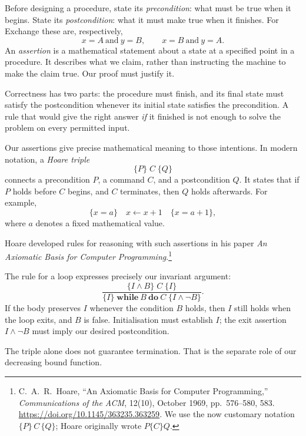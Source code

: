 
Before designing a procedure, state its \emph{precondition}: what must be
true when it begins. State its \emph{postcondition}: what it must make
true when it finishes. For Exchange these are, respectively,
\[
x=A\ \text{and}\ y=B,\qquad x=B\ \text{and}\ y=A.
\]
An \emph{assertion} is a mathematical statement about a state at a specified
point in a procedure. It describes what we claim, rather than instructing
the machine to make the claim true. Our proof must justify it.

Correctness has two parts: the procedure must finish, and its final state
must satisfy the postcondition whenever its initial state satisfies the
precondition. A rule that would give the right answer \emph{if} it finished
is not enough to solve the problem on every permitted input.



Our assertions give precise mathematical meaning to those intentions.
In modern notation, a \emph{Hoare triple}
\[
\{P\}\;C\;\{Q\}
\]
connects a precondition $P$, a command $C$, and a postcondition $Q$.
It states that if $P$ holds before $C$ begins, and $C$ terminates,
then $Q$ holds afterwards. For example,
\[
\{x=a\}\quad x\leftarrow x+1\quad\{x=a+1\},
\]
where $a$ denotes a fixed mathematical value.

Hoare developed rules for reasoning with such assertions in his
paper \emph{An Axiomatic Basis for Computer Programming}.\footnote{
C.~A.~R.~Hoare, ``An Axiomatic Basis for Computer Programming,''
\emph{Communications of the ACM}, 12(10), October 1969,
pp.~576--580, 583.
\url{https://doi.org/10.1145/363235.363259}.
We use the now customary notation $\{P\}\,C\,\{Q\}$;
Hoare originally wrote $P\{C\}Q$.}

The rule for a loop expresses precisely our invariant argument:
\[
\frac{\{I\land B\}\;C\;\{I\}}
     {\{I\}\;\mathbf{while}\ B\ \mathbf{do}\ C\;
      \{I\land\neg B\}}.
\]
If the body preserves $I$ whenever the condition $B$ holds,
then $I$ still holds when the loop exits, and $B$ is false.
Initialisation must establish $I$; the exit assertion
$I\land\neg B$ must imply our desired postcondition.

The triple alone does not guarantee termination.
That is the separate role of our decreasing bound function.

